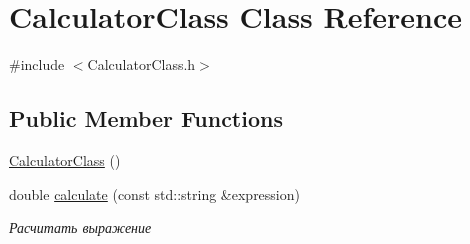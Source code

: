 \hypertarget{class_calculator_class}{}\section{Calculator\+Class Class Reference}
\label{class_calculator_class}


{\ttfamily \#include $<$Calculator\+Class.\+h$>$}

\subsection*{Public Member Functions}
\begin{DoxyCompactItemize}
\item 
\hyperlink{class_calculator_class_a626df0251eb67897ea4a0d85535462d4}{Calculator\+Class} ()
\item 
double \hyperlink{class_calculator_class_a88a60d0c23c67a06c8e62b217607d24d}{calculate} (const std\+::string \&expression)
\begin{DoxyCompactList}\small\item\em Расчитать выражение \end{DoxyCompactList}\end{DoxyCompactItemize}
